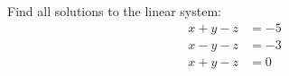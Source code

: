 Find all solutions to the linear system:
\begin{align*}
 x + y - z &= -5\\
 x - y - z &= -3\\
 x + y - z &= 0
\end{align*}
